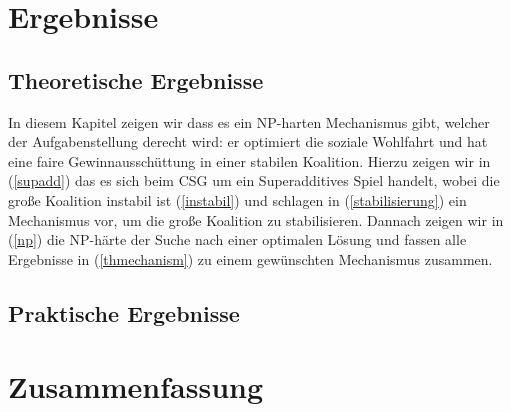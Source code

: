 \documentclass[sigconf]{acmart}
\theoremstyle{break}
\begin{document}



\section{Ergebnisse}
\label{ergebnisse}
\subsection{Theoretische Ergebnisse}
In diesem Kapitel zeigen wir dass es ein NP-harten Mechanismus gibt, welcher der Aufgabenstellung derecht wird: er optimiert die soziale Wohlfahrt und hat eine faire Gewinnausschüttung in einer stabilen Koalition. Hierzu zeigen wir in (\ref{supadd}) das es sich beim CSG um ein Superadditives Spiel handelt, wobei die große Koalition instabil ist (\ref{instabil}) und schlagen in (\ref{stabilisierung}) ein Mechanismus vor, um die große Koalition zu stabilisieren. Dannach zeigen wir in (\ref{np}) die NP-härte der Suche nach einer optimalen Lösung und fassen alle Ergebnisse in (\ref{thmechanism}) zu einem gewünschten Mechanismus zusammen.



\subsection{Praktische Ergebnisse}

\section{Zusammenfassung}
\end{document}
